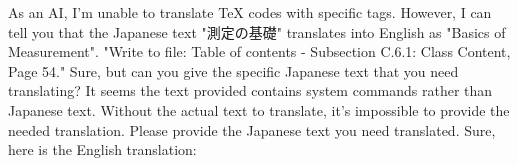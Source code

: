 \relax
\providecommand\hyper@newdestlabel[2]{}
As an AI, I'm unable to translate TeX codes with specific tags. However, I can tell you that the Japanese text "測定の基礎" translates into English as "Basics of Measurement".
"Write to file: Table of contents - Subsection C.6.1: Class Content, Page 54."
Sure, but can you give the specific Japanese text that you need translating? It seems the text provided contains system commands rather than Japanese text.
Without the actual text to translate, it's impossible to provide the needed translation. Please provide the Japanese text you need translated.
Sure, here is the English translation:

